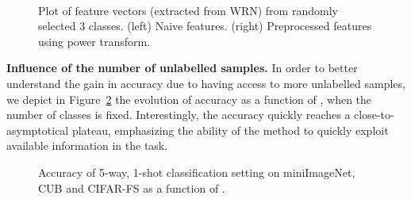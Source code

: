 \documentclass[review]{elsarticle}
\begin{document}
\begin{figure}[h]
\centering
{}\qquad
{}\\
\caption{Plot of feature vectors (extracted from WRN) from randomly selected 3 classes. (left) Naive features. (right)  Preprocessed features using power transform.}
\label{fig:analysept2}
\end{figure}


\textbf{Influence of the number of unlabelled samples.} In order to better understand the gain in accuracy due to having access to more unlabelled samples, we depict in Figure~\ref{fig:functionofq} the evolution of accuracy as a function of , when the number of classes  is fixed. Interestingly, the accuracy quickly reaches a close-to-asymptotical plateau, emphasizing the ability of the method to quickly exploit available information in the task.

\begin{figure}[h]
  \begin{center}
  \end{center}
  \vspace{-.5cm}
  \caption{Accuracy of 5-way, 1-shot classification setting on miniImageNet, CUB and CIFAR-FS as a function of .}
  \label{fig:functionofq}
\end{figure}
\end{document}
